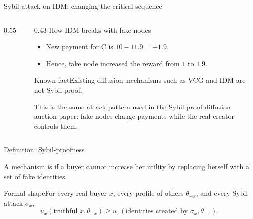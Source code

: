 \documentclass[10pt,aspectratio=169]{beamer}
\newcommand{\greenblock}[2]{\begin{exampleblock}{#1}#2\end{exampleblock}}
\newcommand{\impterm}[1]{\textbf{\color{purple}{#1}}}
\begin{document}
\begin{frame}{Sybil attack on IDM: changing the critical sequence}
\begin{columns}[T,totalwidth=\textwidth]
\begin{column}{0.55\textwidth}
\begin{figure}
  \end{figure}
\end{column}
\begin{column}{0.43\textwidth}
  {\large How IDM breaks with fake nodes}
\begin{itemize}
    \item New payment for C is $10 - 11.9 = -1.9$.
    \item Hence, fake node increased the reward from $1$ to $1.9$.
 \end{itemize}
\greenblock{Known fact}{Existing diffusion mechanisms such as VCG and IDM are not Sybil-proof.}
\vspace{-1mm}
{\tiny This is the same attack pattern used in the Sybil-proof diffusion auction paper: fake nodes change payments while the real creator controls them.}
\end{column}
\end{columns}
\end{frame}

\begin{frame}{Definition: Sybil-proofness}
\begin{definition}
A mechanism is \impterm{Sybil-proof} if a buyer cannot increase her utility by replacing herself with a set of fake identities.
\end{definition}
\vspace{2mm}
\greenblock{Formal shape}{For every real buyer $x$, every profile of others $\theta_{-x}$, and every Sybil attack $\sigma_x$,
\[
    u_x(\text{truthful }x,\theta_{-x})
    \ge
    u_x(\text{identities created by }\sigma_x,\theta_{-x}).
\]
}
\end{frame}
\end{document}
